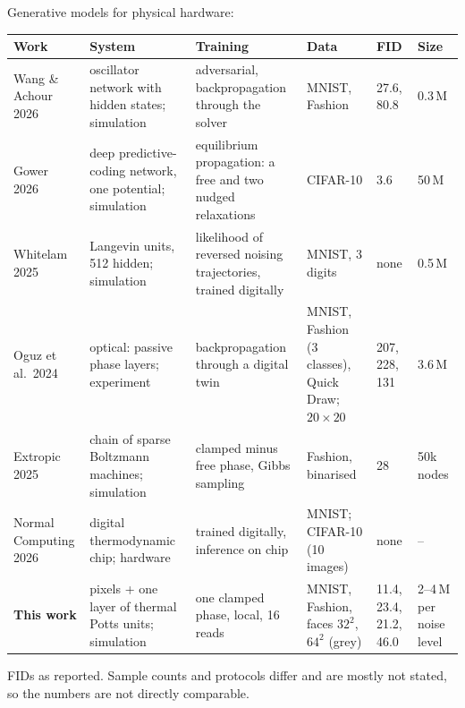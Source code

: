 \documentclass[aspectratio=169,10pt]{beamer}
\begin{document}
\begin{frame}{Generative models for physical hardware:}
  \scriptsize
  \setlength{\tabcolsep}{3pt}
  \renewcommand{\arraystretch}{1.25}
  \begin{tabular}{@{}L{2.0cm}L{3.3cm}L{3.3cm}L{2.3cm}L{1.35cm}L{1.3cm}@{}}
    \toprule
    Work & System & Training & Data & FID & Size \\
    \midrule
    Wang \& Achour 2026 & oscillator network with hidden states; simulation &
      adversarial, backpropagation through the solver & MNIST, Fashion & 27.6, 80.8 & 0.3\,M \\
    Gower 2026 & deep predictive-coding network, one potential; simulation &
      equilibrium propagation: a free and two nudged relaxations & CIFAR-10 & 3.6 & 50\,M \\
    Whitelam 2025 & Langevin units, 512 hidden; simulation &
      likelihood of reversed noising trajectories, trained digitally & MNIST, 3 digits & none & 0.5\,M \\
    Oguz et al.\ 2024 & optical: passive phase layers; experiment &
      backpropagation through a digital twin & MNIST, Fashion (3 classes), Quick Draw; $20\times20$ &
      207, 228, 131 & 3.6\,M \\
    Extropic 2025 & chain of sparse Boltzmann machines; simulation &
      clamped minus free phase, Gibbs sampling & Fashion, binarised & 28 & 50k nodes \\
    Normal Computing 2026 & digital thermodynamic chip; hardware &
      trained digitally, inference on chip & MNIST; CIFAR-10 (10 images) & none & -- \\
    \midrule
    \textbf{This work} & pixels + one layer of thermal Potts units; simulation &
      one clamped phase, local, 16 reads & MNIST, Fashion, faces $32^2$, $64^2$ (grey) &
      11.4, 23.4, 21.2, 46.0 & 2--4\,M per noise level \\
    \bottomrule
  \end{tabular}

  \vspace{0.15cm}
  {\color{muted} FIDs as reported. Sample counts and protocols differ and are mostly not stated, so the
  numbers are not directly comparable.}
\end{frame}
\end{document}
